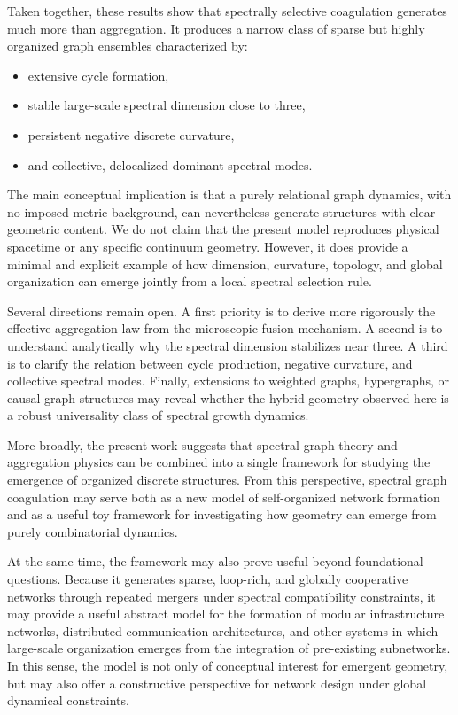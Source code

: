 \documentclass[11pt]{article}
\begin{document}
Taken together, these results show that spectrally selective coagulation generates much more than aggregation.
It produces a narrow class of sparse but highly organized graph ensembles characterized by:
\begin{itemize}
\item extensive cycle formation,
\item stable large-scale spectral dimension close to three,
\item persistent negative discrete curvature,
\item and collective, delocalized dominant spectral modes.
\end{itemize}

The main conceptual implication is that a purely relational graph dynamics, with no imposed metric background, can nevertheless generate structures with clear geometric content.
We do not claim that the present model reproduces physical spacetime or any specific continuum geometry.
However, it does provide a minimal and explicit example of how dimension, curvature, topology, and global organization can emerge jointly from a local spectral selection rule.

Several directions remain open.
A first priority is to derive more rigorously the effective aggregation law from the microscopic fusion mechanism.
A second is to understand analytically why the spectral dimension stabilizes near three.
A third is to clarify the relation between cycle production, negative curvature, and collective spectral modes.
Finally, extensions to weighted graphs, hypergraphs, or causal graph structures may reveal whether the hybrid geometry observed here is a robust universality class of spectral growth dynamics.

More broadly, the present work suggests that spectral graph theory and aggregation physics can be combined into a single framework for studying the emergence of organized discrete structures.
From this perspective, spectral graph coagulation may serve both as a new model of self-organized network formation and as a useful toy framework for investigating how geometry can emerge from purely combinatorial dynamics.

At the same time, the framework may also prove useful beyond foundational questions.
Because it generates sparse, loop-rich, and globally cooperative networks through repeated mergers under spectral compatibility constraints, it may provide a useful abstract model for the formation of modular infrastructure networks, distributed communication architectures, and other systems in which large-scale organization emerges from the integration of pre-existing subnetworks.
In this sense, the model is not only of conceptual interest for emergent geometry, but may also offer a constructive perspective for network design under global dynamical constraints.
\appendix
\end{document}
